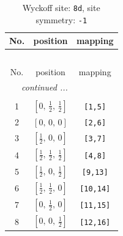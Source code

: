 \documentclass[fleqn,8pt]{jsarticle}
\begin{document}
\begin{longtable}{ccc}
\caption{Wyckoff site: {\tt 8d}, site symmetry: {\tt -1}}
 \\
 \hline \hline
No. & position & mapping \\ \hline \endfirsthead

\multicolumn{2}{l}{\tablename\ \thetable{}} \\
 \hline \hline
No. & position & mapping \\ \hline \endhead

 \hline \hline
\multicolumn{2}{r}{\footnotesize\it continued ...} \\ \endfoot

 \hline \hline
\multicolumn{2}{r}{} \\ \endlastfoot

1 & $\left[ 0,\, \frac{1}{2},\, \frac{1}{2} \right]$ & {\tt [1,5]} \\ \hline
2 & $\left[ 0,\, 0,\, 0 \right]$ & {\tt [2,6]} \\ \hline
3 & $\left[ \frac{1}{2},\, 0,\, 0 \right]$ & {\tt [3,7]} \\ \hline
4 & $\left[ \frac{1}{2},\, \frac{1}{2},\, \frac{1}{2} \right]$ & {\tt [4,8]} \\ \hline
5 & $\left[ \frac{1}{2},\, 0,\, \frac{1}{2} \right]$ & {\tt [9,13]} \\ \hline
6 & $\left[ \frac{1}{2},\, \frac{1}{2},\, 0 \right]$ & {\tt [10,14]} \\ \hline
7 & $\left[ 0,\, \frac{1}{2},\, 0 \right]$ & {\tt [11,15]} \\ \hline
8 & $\left[ 0,\, 0,\, \frac{1}{2} \right]$ & {\tt [12,16]} \\
\end{longtable}
\renewcommand{\arraystretch}{1.2}
\end{document}
